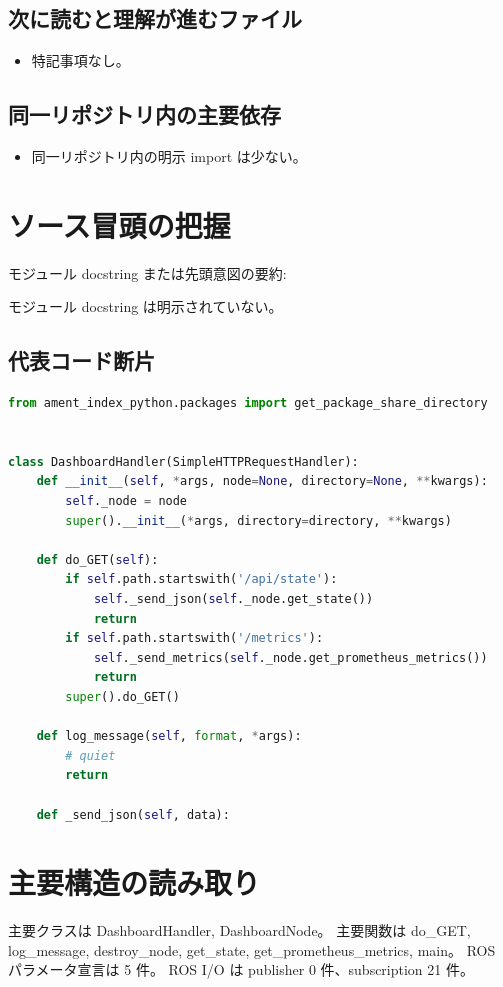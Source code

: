 \documentclass[a4paper,11pt]{article}
\begin{document}
        \subsection{次に読むと理解が進むファイル}
        \begin{itemize}[leftmargin=1.6em]
        \item 特記事項なし。
        \end{itemize}

        \subsection{同一リポジトリ内の主要依存}
        \begin{itemize}[leftmargin=1.6em]
        \item 同一リポジトリ内の明示 import は少ない。
        \end{itemize}

        \section{ソース冒頭の把握}
        モジュール docstring または先頭意図の要約:

        モジュール docstring は明示されていない。

        \subsection{代表コード断片}
        \begin{lstlisting}[language=Python]
from ament_index_python.packages import get_package_share_directory


class DashboardHandler(SimpleHTTPRequestHandler):
    def __init__(self, *args, node=None, directory=None, **kwargs):
        self._node = node
        super().__init__(*args, directory=directory, **kwargs)

    def do_GET(self):
        if self.path.startswith('/api/state'):
            self._send_json(self._node.get_state())
            return
        if self.path.startswith('/metrics'):
            self._send_metrics(self._node.get_prometheus_metrics())
            return
        super().do_GET()

    def log_message(self, format, *args):
        # quiet
        return

    def _send_json(self, data):
\end{lstlisting}


        \section{主要構造の読み取り}
        主要クラスは DashboardHandler, DashboardNode。 主要関数は do\_GET, log\_message, destroy\_node, get\_state, get\_prometheus\_metrics, main。 ROS パラメータ宣言は 5 件。 ROS I/O は publisher 0 件、subscription 21 件。
\end{document}
